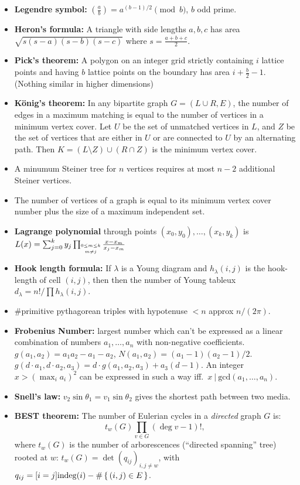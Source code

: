 \documentclass[8pt,a4paper,landscape,oneside]{amsart}
\newenvironment{myitemize}
{\begin{itemize}[leftmargin=.3cm]
	\setlength{\itemsep}{0pt}
	\setlength{\parskip}{0pt}
	\setlength{\parsep}{0pt}     }
{ \end{itemize}                  }
\begin{document}
\begin{multicols*}{3}
\begin{myitemize}
	\item \textbf{Legendre symbol:} $\left(\frac{a}{b}\right) = a^{(b-1)/2} \pmod{b}$, $b$ odd prime.
	\item \textbf{Heron's formula:} A triangle with side lengths
		$a,b,c$ has area $\sqrt{s(s-a)(s-b)(s-c)}$ where $s =
		\frac{a+b+c}{2}$.
	\item \textbf{Pick's theorem:} A polygon on an integer grid
		strictly containing $i$ lattice points and having $b$ lattice
		points on the boundary has area $i + \frac{b}{2} - 1$. (Nothing
		similar in higher dimensions)
	\item \textbf{König's theorem:} In any bipartite graph $G=(L\cup R,E)$, the number
		of edges in a maximum matching is equal to the number of
		vertices in a minimum vertex cover. Let $U$ be the set of
		unmatched vertices in $L$, and $Z$ be the set of vertices that
		are either in $U$ or are connected to $U$ by an alternating
		path. Then $K=(L\setminus Z)\cup(R\cap Z)$ is the minimum
		vertex cover.
	\item A minumum Steiner tree for $n$ vertices requires at most $n-2$ additional Steiner vertices.
	\item The number of vertices of a graph is equal to its minimum
		vertex cover number plus the size of a maximum independent set.
	\item \textbf{Lagrange polynomial} through points $(x_0,y_0),\ldots,(x_k,y_k)$ is $L(x) = \sum_{j=0}^k y_j \prod_{\shortstack{$\scriptscriptstyle 0\leq m \leq k$ \\ $\scriptscriptstyle m\neq j$}} \frac{x-x_m}{x_j - x_m}$
	\item \textbf{Hook length formula:} If $\lambda$ is a Young diagram and $h_{\lambda}(i,j)$ is the hook-length of cell $(i,j)$, then then the number of Young tableux $d_{\lambda} = n!/\prod h_{\lambda}(i,j)$.
	\item \#primitive pythagorean triples with hypotenuse $<n$ approx $n/(2\pi)$.
	\item \textbf{Frobenius Number:} largest number which can't be
		expressed as a linear combination of numbers $a_1,\ldots,a_n$
		with non-negative coefficients. $g(a_1,a_2) = a_1a_2-a_1-a_2$,
		$N(a_1,a_2)=(a_1-1)(a_2-1)/2$. $g(d\cdot a_1,d\cdot a_2,a_3) =
		d\cdot g(a_1,a_2,a_3) + a_3(d-1)$. An integer $x>\left(\max_i
		a_i\right)^2$ can be expressed in such a way iff.\ $x\ |\
		\mathrm{gcd}(a_1,\ldots,a_n)$.
	\item \textbf{Snell's law:} $v_2 \sin\theta_1 = v_1 \sin\theta_2$ gives the shortest path between two media.
	\item \textbf{BEST theorem:}
		The number of Eulerian cycles in a \emph{directed} graph $G$ is:
		\begin{equation*}
			t_w(G) \prod_{v \in G} (\deg v - 1)!,
		\end{equation*}
		where $t_w(G)$ is the number of arborescences (``directed spanning'' tree) rooted at $w$: $t_w(G) = \det\left( q_{ij} \right)_{i,j \neq w}$, with $q_{ij} = [i=j] \mathrm{indeg}(i) - \# \set{(i,j) \in E}$.
\end{myitemize}


\end{multicols*}
\end{document}
